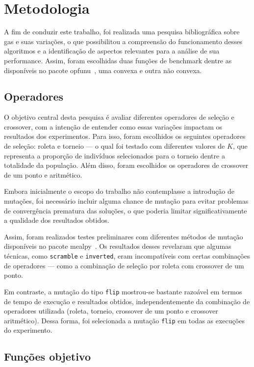 \section{Metodologia}%
\label{sec:metodologia}

A fim de conduzir este trabalho, foi realizada uma pesquisa bibliográfica sobre \glspl{ga} e suas variações, o que possibilitou a compreensão do funcionamento desses algoritmos e a identificação de aspectos relevantes para a análise de sua performance.
Assim, foram escolhidas duas funções de benchmark dentre as disponíveis no pacote \gls{opfunu}~\cite{opfunu_software}, uma convexa e outra não convexa.

\subsection{Operadores}

O objetivo central desta pesquisa é avaliar diferentes operadores de seleção e \gls{crossover}, com a intenção de entender como essas variações impactam os resultados dos experimentos.
Para isso, foram escolhidos os seguintes operadores de seleção: roleta e torneio --- o qual foi testado com diferentes valores de \(K\), que representa a proporção de indivíduos selecionados para o torneio dentre a totalidade da população.
Além disso, foram escolhidos os operadores de \gls{crossover} de um ponto e aritmético.

Embora inicialmente o escopo do trabalho não contemplasse a introdução de mutações, foi necessário incluir alguma chance de mutação para evitar problemas de convergência prematura das soluções, o que poderia limitar significativamente a qualidade dos resultados obtidos.

Assim, foram realizados testes preliminares com diferentes métodos de mutação disponíveis no pacote \gls{mealpy}~\cite{mealpy_software}.
Os resultados desses revelaram que algumas técnicas, como \texttt{scramble} e \texttt{inverted}, eram incompatíveis com certas combinações de operadores --- como a combinação de seleção por roleta com crossover de um ponto.

Em contraste, a mutação do tipo \texttt{flip} mostrou-se bastante razoável em termos de tempo de execução e resultados obtidos, independentemente da combinação de operadores utilizada (roleta, torneio, crossover de um ponto e crossover aritmético).
Dessa forma, foi selecionada a mutação \texttt{flip} em todas as execuções do experimento.

\subsection{Funções objetivo}

